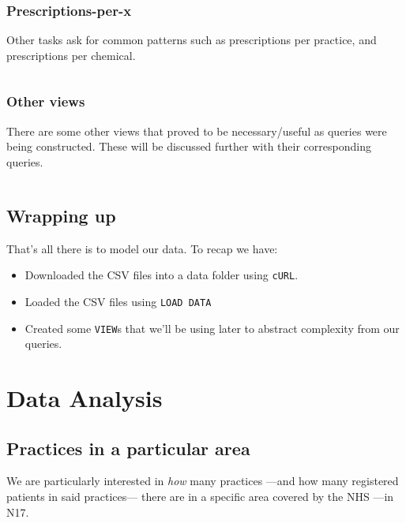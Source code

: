 \documentclass[english,a4paper,]{report}
\providecommand{\tightlist}{%
  \setlength{\itemsep}{0pt}\setlength{\parskip}{0pt}}
\begin{document}
\inputminted[firstline=4,lastline=23]{sql}{src/sql/01-views.sql}

\subsection{Prescriptions-per-x}\label{prescriptions-per-x}

Other tasks ask for common patterns such as prescriptions per practice,
and prescriptions per chemical.

\inputminted[firstline=26,lastline=38]{sql}{src/sql/01-views.sql}

\subsection{Other views}\label{other-views}

There are some other views that proved to be necessary/useful as queries
were being constructed. These will be discussed further with their
corresponding queries.

\inputminted[firstline=41]{sql}{src/sql/01-views.sql}

\section{Wrapping up}\label{wrapping-up-1}

That's all there is to model our data. To recap we have:

\begin{itemize}
\tightlist
\item
  Downloaded the CSV files into a data folder using \texttt{cURL}.
\item
  Loaded the CSV files using \texttt{LOAD\ DATA}
\item
  Created some \texttt{VIEW}s that we'll be using later to abstract
  complexity from our queries.
\end{itemize}

\chapter{Data Analysis}\label{data-analysis}

\section{Practices in a particular
area}\label{practices-in-a-particular-area}

We are particularly interested in \emph{how} many practices ---and how
many registered patients in said practices--- there are in a specific
area covered by the NHS ---in N17.
\end{document}

